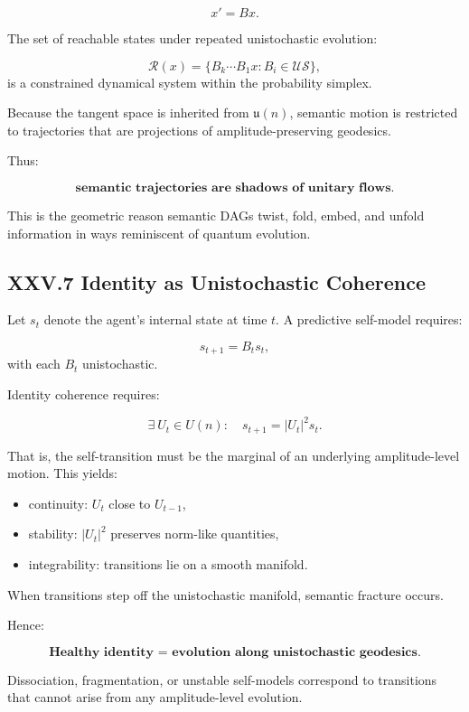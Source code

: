 \documentclass[12pt,letterpaper]{article}
\begin{document}
\[
x' = Bx.
\]

The set of reachable states under repeated unistochastic evolution:

\[
\mathcal{R}(x) = \{ B_k \cdots B_1 x : B_i \in \mathcal{U\!S} \},
\]
is a constrained dynamical system within the probability simplex.

Because the tangent space is inherited from $\mathfrak{u}(n)$, semantic motion is restricted to trajectories that are projections of amplitude-preserving geodesics.

Thus:

\[
\textbf{semantic trajectories are shadows of unitary flows}.
\]

This is the geometric reason semantic DAGs twist, fold, embed, and unfold information in ways reminiscent of quantum evolution.

\subsection{XXV.7 Identity as Unistochastic Coherence}

Let $s_t$ denote the agent’s internal state at time $t$. A predictive self-model requires:

\[
s_{t+1} = B_t s_t,
\]
with each $B_t$ unistochastic.

Identity coherence requires:

\[
\exists \ U_t \in U(n): \quad s_{t+1} = |U_t|^2 s_t.
\]

That is, the self-transition must be the marginal of an underlying amplitude-level motion. This yields:

\begin{itemize}
    \item continuity: $U_t$ close to $U_{t-1}$,
    \item stability: $|U_t|^2$ preserves norm-like quantities,
    \item integrability: transitions lie on a smooth manifold.
\end{itemize}

When transitions step off the unistochastic manifold, semantic fracture occurs.

Hence:

\[
\textbf{Healthy identity = evolution along unistochastic geodesics.}
\]

Dissociation, fragmentation, or unstable self-models correspond to transitions that cannot arise from any amplitude-level evolution.
\end{document}
